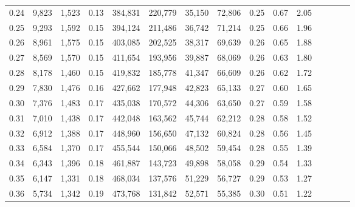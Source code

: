 \begin{tabular}{rrrcrrrrrrrrrrr}
0.24 &   9,823 &   1,523 &                                       0.13 &  384,831 &  220,779 &   35,150 &   72,806 &  0.25 &  0.67 &                         2.05 \\
0.25 &   9,293 &   1,592 &                                       0.15 &  394,124 &  211,486 &   36,742 &   71,214 &  0.25 &  0.66 &                         1.96 \\
0.26 &   8,961 &   1,575 &                                       0.15 &  403,085 &  202,525 &   38,317 &   69,639 &  0.26 &  0.65 &                         1.88 \\
0.27 &   8,569 &   1,570 &                                       0.15 &  411,654 &  193,956 &   39,887 &   68,069 &  0.26 &  0.63 &                         1.80 \\
0.28 &   8,178 &   1,460 &                                       0.15 &  419,832 &  185,778 &   41,347 &   66,609 &  0.26 &  0.62 &                         1.72 \\
0.29 &   7,830 &   1,476 &                                       0.16 &  427,662 &  177,948 &   42,823 &   65,133 &  0.27 &  0.60 &                         1.65 \\
0.30 &   7,376 &   1,483 &                                       0.17 &  435,038 &  170,572 &   44,306 &   63,650 &  0.27 &  0.59 &                         1.58 \\
0.31 &   7,010 &   1,438 &                                       0.17 &  442,048 &  163,562 &   45,744 &   62,212 &  0.28 &  0.58 &                         1.52 \\
0.32 &   6,912 &   1,388 &                                       0.17 &  448,960 &  156,650 &   47,132 &   60,824 &  0.28 &  0.56 &                         1.45 \\
0.33 &   6,584 &   1,370 &                                       0.17 &  455,544 &  150,066 &   48,502 &   59,454 &  0.28 &  0.55 &                         1.39 \\
0.34 &   6,343 &   1,396 &                                       0.18 &  461,887 &  143,723 &   49,898 &   58,058 &  0.29 &  0.54 &                         1.33 \\
0.35 &   6,147 &   1,331 &                                       0.18 &  468,034 &  137,576 &   51,229 &   56,727 &  0.29 &  0.53 &                         1.27 \\
0.36 &   5,734 &   1,342 &                                       0.19 &  473,768 &  131,842 &   52,571 &   55,385 &  0.30 &  0.51 &                         1.22 \\

\end{tabular}

